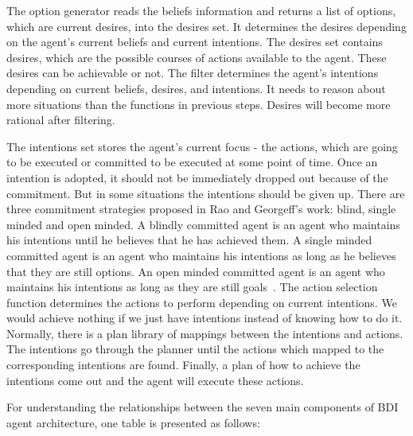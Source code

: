 The option generator reads the beliefs information and returns a list of options, which are current desires, into the desires set.
It determines the desires depending on the agent's current beliefs and current intentions.
The desires set contains desires, which are the possible courses of actions available to the agent.
These desires can be achievable or not.
The filter determines the agent's intentions depending on current beliefs, desires, and intentions.
It needs to reason about more situations than the functions in previous steps.
Desires will become more rational after filtering.

The intentions set stores the agent's current focus - the actions, which are going to be executed or committed to be executed at some point of time.
Once an intention is adopted, it should not be immediately dropped out because of the commitment.
But in some situations the intentions should be given up.
There are three commitment strategies proposed in Rao and Georgeff's work: blind, single minded and open minded.
A blindly committed agent is an agent who maintains his intentions until he believes that he has achieved them.
A single minded committed agent is an agent who maintains his intentions as long as he believes that they are still options.
An open minded committed agent is an agent who maintains his intentions as long as they are still goals~\cite{Roberto_BDIATL_2005}.
The action selection function determines the actions to perform depending on current intentions.
We would achieve nothing if we just have intentions instead of knowing how to do it.
Normally, there is a plan library of mappings between the intentions and actions.
The intentions go through the planner until the actions which mapped to the corresponding intentions are found.
Finally, a plan of how to achieve the intentions come out and the agent will execute these actions.

For understanding the relationships between the seven main components of BDI agent architecture, one table is presented as follows:

